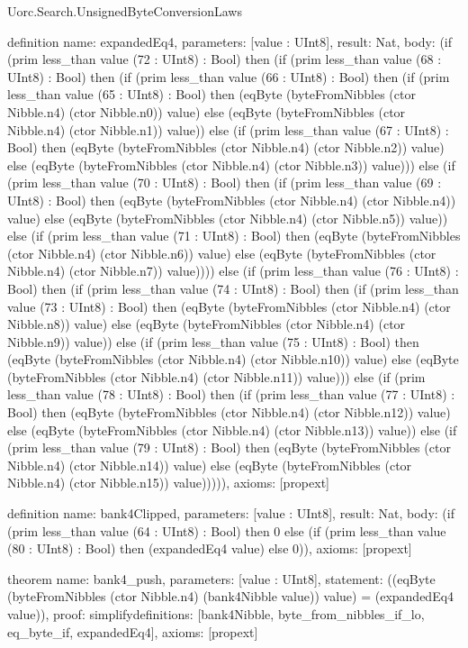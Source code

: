 \begin{lexlean}{Uorc.Search.UnsignedByteConversionLaws}
\begin{semanticmodule}
definition{
  name: expandedEq4,
  parameters: [value : UInt8],
  result: Nat,
  body: (if (prim less_than value (72 : UInt8) : Bool) then (if (prim less_than value (68 : UInt8) : Bool) then (if (prim less_than value (66 : UInt8) : Bool) then (if (prim less_than value (65 : UInt8) : Bool) then (eqByte (byteFromNibbles (ctor Nibble.n4) (ctor Nibble.n0)) value) else (eqByte (byteFromNibbles (ctor Nibble.n4) (ctor Nibble.n1)) value)) else (if (prim less_than value (67 : UInt8) : Bool) then (eqByte (byteFromNibbles (ctor Nibble.n4) (ctor Nibble.n2)) value) else (eqByte (byteFromNibbles (ctor Nibble.n4) (ctor Nibble.n3)) value))) else (if (prim less_than value (70 : UInt8) : Bool) then (if (prim less_than value (69 : UInt8) : Bool) then (eqByte (byteFromNibbles (ctor Nibble.n4) (ctor Nibble.n4)) value) else (eqByte (byteFromNibbles (ctor Nibble.n4) (ctor Nibble.n5)) value)) else (if (prim less_than value (71 : UInt8) : Bool) then (eqByte (byteFromNibbles (ctor Nibble.n4) (ctor Nibble.n6)) value) else (eqByte (byteFromNibbles (ctor Nibble.n4) (ctor Nibble.n7)) value)))) else (if (prim less_than value (76 : UInt8) : Bool) then (if (prim less_than value (74 : UInt8) : Bool) then (if (prim less_than value (73 : UInt8) : Bool) then (eqByte (byteFromNibbles (ctor Nibble.n4) (ctor Nibble.n8)) value) else (eqByte (byteFromNibbles (ctor Nibble.n4) (ctor Nibble.n9)) value)) else (if (prim less_than value (75 : UInt8) : Bool) then (eqByte (byteFromNibbles (ctor Nibble.n4) (ctor Nibble.n10)) value) else (eqByte (byteFromNibbles (ctor Nibble.n4) (ctor Nibble.n11)) value))) else (if (prim less_than value (78 : UInt8) : Bool) then (if (prim less_than value (77 : UInt8) : Bool) then (eqByte (byteFromNibbles (ctor Nibble.n4) (ctor Nibble.n12)) value) else (eqByte (byteFromNibbles (ctor Nibble.n4) (ctor Nibble.n13)) value)) else (if (prim less_than value (79 : UInt8) : Bool) then (eqByte (byteFromNibbles (ctor Nibble.n4) (ctor Nibble.n14)) value) else (eqByte (byteFromNibbles (ctor Nibble.n4) (ctor Nibble.n15)) value))))),
  axioms: [propext]
}

definition{
  name: bank4Clipped,
  parameters: [value : UInt8],
  result: Nat,
  body: (if (prim less_than value (64 : UInt8) : Bool) then 0 else (if (prim less_than value (80 : UInt8) : Bool) then (expandedEq4 value) else 0)),
  axioms: [propext]
}

theorem{
  name: bank4_push,
  parameters: [value : UInt8],
  statement: ((eqByte (byteFromNibbles (ctor Nibble.n4) (bank4Nibble value)) value) = (expandedEq4 value)),
  proof: simplify{definitions: [bank4Nibble, byte_from_nibbles_if_lo, eq_byte_if, expandedEq4]},
  axioms: [propext]
}


\end{semanticmodule}
\end{lexlean}
